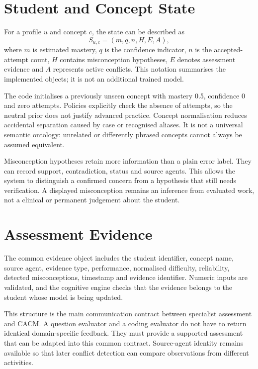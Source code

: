 \section{Student and Concept State}
For a profile $u$ and concept $c$, the state can be described as
\begin{equation}
S_{u,c}=(m,q,n,H,E,A),
\end{equation}
where $m$ is estimated mastery, $q$ is the confidence indicator, $n$ is the accepted-attempt count, $H$ contains misconception hypotheses, $E$ denotes assessment evidence and $A$ represents active conflicts. This notation summarises the implemented objects; it is not an additional trained model.

The code initialises a previously unseen concept with mastery 0.5, confidence 0 and zero attempts. Policies explicitly check the absence of attempts, so the neutral prior does not justify advanced practice. Concept normalisation reduces accidental separation caused by case or recognised aliases. It is not a universal semantic ontology: unrelated or differently phrased concepts cannot always be assumed equivalent.

Misconception hypotheses retain more information than a plain error label. They can record support, contradiction, status and source agents. This allows the system to distinguish a confirmed concern from a hypothesis that still needs verification. A displayed misconception remains an inference from evaluated work, not a clinical or permanent judgement about the student.

\section{Assessment Evidence}
The common evidence object includes the student identifier, concept name, source agent, evidence type, performance, normalised difficulty, reliability, detected misconceptions, timestamp and evidence identifier. Numeric inputs are validated, and the cognitive engine checks that the evidence belongs to the student whose model is being updated.

This structure is the main communication contract between specialist assessment and CACM. A question evaluator and a coding evaluator do not have to return identical domain-specific feedback. They must provide a supported assessment that can be adapted into this common contract. Source-agent identity remains available so that later conflict detection can compare observations from different activities.


